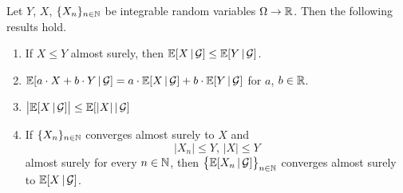 \begin{theorem}\label{theorem:mainpropertiesofconditionalexpectation}
Let $Y$, $X$, $\{X_n\}_{n\in {\mathbb N}}$ be integrable random variables $\Omega \rightarrow {\mathbb R}$. Then the following results hold.
\begin{enumerate}[label=\emph{\textbf{(\arabic*)}}, leftmargin=*]
\item If $X \leq Y$ almost surely, then $\mathbb{E}[X\,|\,{\mathcal G}] \leq \mathbb{E}[Y\,|\,{\mathcal G}]$.
\item $\mathbb{E}[a\cdot X+b\cdot Y\,|\,{\mathcal G}] = a\cdot \mathbb{E}[X\,|\,{\mathcal G}]+b\cdot \mathbb{E}[Y\,|\,{\mathcal G}]$ for $a$, $b\in {\mathbb R}$.
\item $\big|\mathbb{E}[X\,|\,{\mathcal G}]\big|\leq \mathbb{E}[|X|\,|\,{\mathcal G}]$

\item If $\{X_n\}_{n\in {\mathbb N}}$ converges almost surely to $X$ and 
$$|X_n|\leq Y,\,|X|\leq Y$$
almost surely for every $n\in {\mathbb N}$, then $\big\{\mathbb{E}[X_n\,|\,{\mathcal G}]\big\}_{n\in {\mathbb N}}$ converges almost surely to $\mathbb{E}[X\,|\,{\mathcal G}]$.
\end{enumerate}
\end{theorem}
